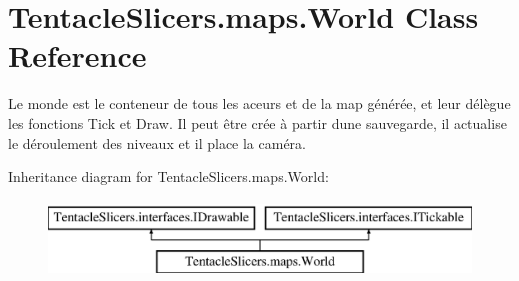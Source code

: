 \hypertarget{class_tentacle_slicers_1_1maps_1_1_world}{}\section{Tentacle\+Slicers.\+maps.\+World Class Reference}
\label{class_tentacle_slicers_1_1maps_1_1_world}


Le monde est le conteneur de tous les aceurs et de la map générée, et leur délègue les fonctions Tick et Draw. Il peut être crée à partir d\textquotesingle{}une sauvegarde, il actualise le déroulement des niveaux et il place la caméra.  


Inheritance diagram for Tentacle\+Slicers.\+maps.\+World\+:\begin{figure}[H]
\begin{center}
\leavevmode
\includegraphics[height=2.000000cm]{class_tentacle_slicers_1_1maps_1_1_world}
\end{center}
\end{figure}
